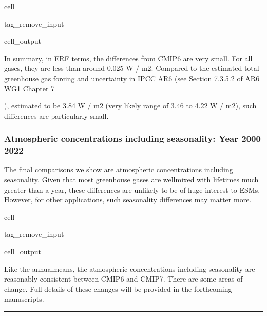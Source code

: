 \documentclass[letterpaper,10pt,english]{jupyterBook}
\begin{document}
\begin{sphinxuseclass}{cell}
\begin{sphinxuseclass}{tag_remove_input}\begin{sphinxVerbatimOutput}

\begin{sphinxuseclass}{cell_output}
\noindent{}

\end{sphinxuseclass}\end{sphinxVerbatimOutput}

\end{sphinxuseclass}
\end{sphinxuseclass}
\sphinxAtStartPar
In summary, in ERF terms, the differences from CMIP6 are very small.
For all gases, they are less than around 0.025 W / m2.
Compared to the estimated total greenhouse gas forcing and uncertainty in IPCC AR6
(see Section 7.3.5.2 of AR6 WG1 Chapter 7%
\begin{footnote}[5]\sphinxAtStartFootnote
{}
%
\end{footnote}),
estimated to be 3.84 W / m2
(very likely range of 3.46 to 4.22 W / m2),
such differences are particularly small.


\subsubsection{Atmospheric concentrations including seasonality: Year 2000 \sphinxhyphen{} 2022}
\label{\detokenize{user-guide-historical:atmospheric-concentrations-including-seasonality-year-2000-2022}}
\sphinxAtStartPar
The final comparisons we show are atmospheric concentrations including seasonality.
Given that most greenhouse gases
are well\sphinxhyphen{}mixed with lifetimes much greater than a year,
these differences are unlikely to be of huge interest to ESMs.
However, for other applications, such seasonality differences may matter more.

\begin{sphinxuseclass}{cell}
\begin{sphinxuseclass}{tag_remove_input}\begin{sphinxVerbatimOutput}

\begin{sphinxuseclass}{cell_output}
\noindent{}

\end{sphinxuseclass}\end{sphinxVerbatimOutput}

\end{sphinxuseclass}
\end{sphinxuseclass}
\sphinxAtStartPar
Like the annual\sphinxhyphen{}means,
the atmospheric concentrations including seasonality
are reasonably consistent between CMIP6 and CMIP7.
There are some areas of change.
Full details of these changes will be provided
in the forthcoming manuscripts.

\label{\detokenize{user-guide-historical:id6}}

\bigskip\hrule\bigskip








\renewcommand{\indexname}{Index}
\printindex
\printbibliography[heading=bibintoc,title={Whole bibliography}]
\end{document}
